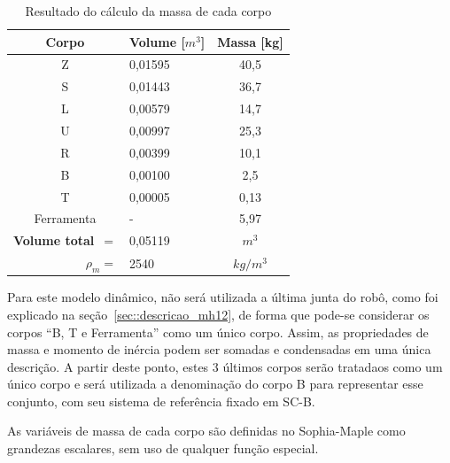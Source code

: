 \begin{table}[h]
\centering
\caption{Resultado do cálculo da massa de cada corpo}
\label{tab::massa_mh12}
\begin{tabular}{@{}clc@{}}
\toprule
\textbf{Corpo}                      & \textbf{Volume} [$m^3$] & \multicolumn{1}{l}{\textbf{Massa} [kg]} \\ \midrule 
Z 									& 0,01595         & 40,5							   \\
S                                   & 0,01443         & 36,7                               \\
L                                   & 0,00579         & 14,7                               \\
U                                   & 0,00997         & 25,3                               \\
R                                   & 0,00399         & 10,1                               \\
B                                   & 0,00100         & 2,5                                \\
T                                   & 0,00005         & 0,13                               \\
Ferramenta                          & -		          & 5,97							   \\ \midrule
\textbf{Volume total}~$=$           & 0,05119        & \multicolumn{1}{c}{$m^3$}	       \\
\multicolumn{1}{r}{\textbf{$\rho_m =$}} & 2540          &
\multicolumn{1}{c}{$kg/{m^3}$}     \\ \bottomrule
\end{tabular}
\end{table}
%

Para este modelo dinâmico, não será utilizada a última junta do robô, como foi
explicado na seção~\ref{sec::descricao_mh12}, de forma que pode-se considerar os
corpos ``B, T e Ferramenta'' como um único corpo. Assim, as propriedades de
massa e momento de inércia podem ser somadas e condensadas em uma única
descrição. A partir deste ponto, estes 3 últimos corpos serão tratadaos como um
único corpo e será utilizada a denominação do corpo B para representar esse
conjunto, com seu sistema de referência fixado em SC-B.

As variáveis de massa de cada corpo são definidas no Sophia-Maple como grandezas
escalares, sem uso de qualquer função especial.

